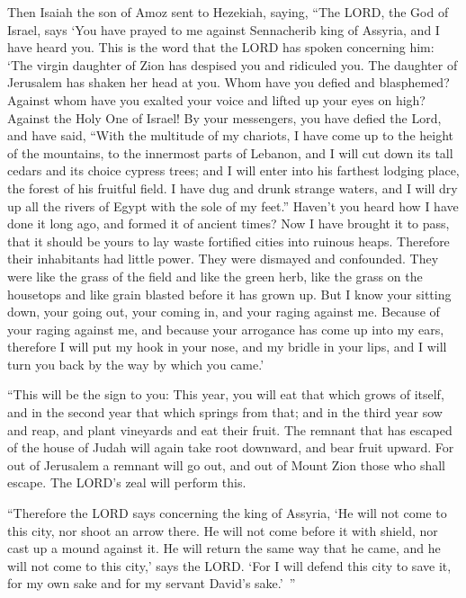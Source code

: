 \myverse{}Then Isaiah the son of Amoz sent to Hezekiah, saying, “The LORD,
the God of Israel, says ‘You have prayed to me against Sennacherib king of Assyria, and I have heard you.
\myverse{}This is the word that the LORD has spoken concerning him: ‘The virgin daughter
of Zion has despised you and ridiculed you. The daughter of Jerusalem has shaken her head at you.
\myverse{}Whom have you defied and blasphemed? Against whom have you exalted your voice
and lifted up your eyes on high? Against the Holy One of Israel!
\myverse{}By your messengers, you have defied the Lord, and have said, “With the multitude
of my chariots, I have come up to the height of the mountains, to the innermost parts of Lebanon, and
I will cut down its tall cedars and its choice cypress trees; and I will enter into his farthest lodging
place, the forest of his fruitful field.
\myverse{}I have dug and drunk strange waters, and I will dry up all the rivers of
Egypt with the sole of my feet.”
\myverse{}Haven’t you heard how I have done it long ago, and formed it of ancient times?
Now I have brought it to pass, that it should be yours to lay waste fortified cities into ruinous heaps.
\myverse{}Therefore their inhabitants had little power. They were dismayed and confounded.
They were like the grass of the field and like the green herb, like the grass on the housetops and like
grain blasted before it has grown up.
\myverse{}But I know your sitting down, your going out, your coming in, and your raging
against me.
\myverse{}Because of your raging against me, and because your arrogance has come up
into my ears, therefore I will put my hook in your nose, and my bridle in your lips, and I will turn you
back by the way by which you came.’

\myverse{}“This will be the sign to you: This year, you will eat that
which grows of itself, and in the second year that which springs from that; and in the third year sow
and reap, and plant vineyards and eat their fruit.
\myverse{}The remnant that has escaped of the house of Judah will again take root downward,
and bear fruit upward.
\myverse{}For out of Jerusalem a remnant will go out, and out of Mount Zion those who
shall escape. The LORD’s zeal will perform this.

\myverse{}“Therefore the LORD says concerning the king of Assyria, ‘He
will not come to this city, nor shoot an arrow there. He will not come before it with shield, nor cast
up a mound against it.
\myverse{}He will return the same way that he came, and he will not come to this city,’
says the LORD.
\myverse{}‘For I will defend this city to save it, for my own sake and for my servant
David’s sake.’ ”

